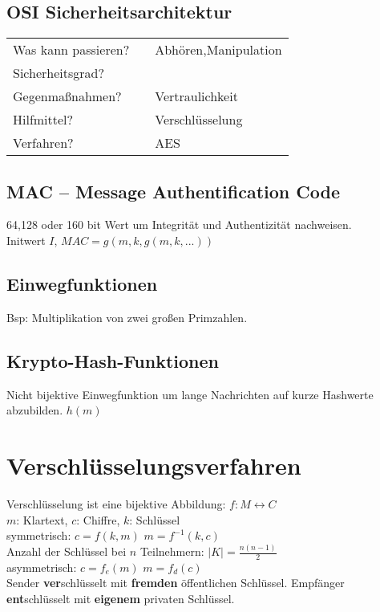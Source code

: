 \documentclass[fs]{latex4ei}
\begin{document}
\begin{multicols}{4}
	
	

	\subsection{OSI Sicherheitsarchitektur}
	\begin{tabular}{l|c|l}
		Was kann passieren? & \framebox{Bedrohungen} & Abhören,Manipulation\\
		Sicherheitsgrad? & \framebox{Regeln} \\
		Gegenmaßnahmen? & \framebox{Sicherheitsdienste} & Vertraulichkeit\\
		Hilfmittel? & \framebox{Mechanismen} & Verschlüsselung\\
		Verfahren? & \framebox{Algorithmen} & AES\\
	\end{tabular}


	\subsection{MAC -- Message Authentification Code}
	64,128 oder 160 bit Wert um Integrität und Authentizität nachweisen. \\
	Initwert $I$, $MAC = g(m,k, g(m,k,...))$\\
	
	\subsection{Einwegfunktionen}
	Bsp: Multiplikation von zwei großen Primzahlen.

	\subsection{Krypto-Hash-Funktionen}
	Nicht bijektive Einwegfunktion um lange Nachrichten auf kurze Hashwerte abzubilden.
	 $h(m)$


\section{Verschlüsselungsverfahren}

Verschlüsselung ist eine bijektive Abbildung: $f:M \leftrightarrow C$\\
$m$: Klartext, $c$: Chiffre, $k$: Schlüssel\\
symmetrisch: $c=f(k,m)$ \qquad $m=f^{-1}(k,c)$\\
Anzahl der Schlüssel bei $n$ Teilnehmern: $|K| = \frac{n(n-1)}{2}$\\
asymmetrisch: $c=f_e(m)$ \qquad $m=f_d(c)$\\
Sender \textbf{ver}schlüsselt mit \textbf{fremden} öffentlichen Schlüssel. Empfänger \textbf{ent}schlüsselt mit \textbf{eigenem} privaten Schlüssel.\\





\end{multicols}
\end{document}
